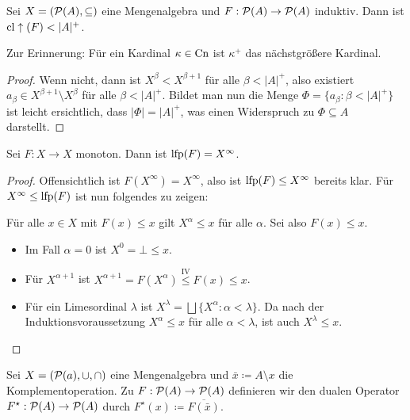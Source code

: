 \begin{lemma}
	Sei $X=(\mathcal{P}(A),\subseteq)$ eine Mengenalgebra und $F:\mathcal{P}(A)\to\mathcal{P}(A)$ induktiv. Dann ist $\operatorname{cl}\uparrow(F)< \vert A\vert ^+$.
\end{lemma}
Zur Erinnerung: Für ein Kardinal $\kappa\in \operatorname{Cn}$ ist $\kappa^+$ das nächstgrößere Kardinal.
\begin{proof}
	Wenn nicht, dann ist $X^\beta < X^{\beta+1}$ für alle $\beta<\vert A \vert^+$, also existiert $a_\beta\in X^{\beta+1}\setminus X^\beta$ für alle $\beta < \vert A \vert^+$. Bildet man nun die Menge $\Phi=\{a_\beta : \beta < \vert A\vert^+\}$ ist leicht ersichtlich, dass $\vert\Phi\vert=\vert A\vert^+$, was einen Widerspruch zu $\Phi\subseteq A$ darstellt.
\end{proof} 

\begin{satz}
	Sei $F:X\to X$ monoton. Dann ist $\operatorname{lfp}(F)=X^\infty$.
\end{satz}
\begin{proof}
	Offensichtlich ist $F(X^\infty)=X^\infty$, also ist $\operatorname{lfp}(F)\leq X^\infty$ bereits klar. Für $X^\infty \leq \operatorname{lfp}(F)$ ist nun folgendes zu zeigen:
	
	Für alle $x\in X$ mit $F(x)\leq x$ gilt $X^\alpha \leq x$ für alle $\alpha$. Sei also $F(x)\leq x$.
	\begin{itemize}
		\item Im Fall $\alpha=0$ ist $X^0=\bot\leq x$.
		\item Für $X^{\alpha+1}$ ist $X^{\alpha+1}=F(X^\alpha)\overset{\text{IV}}{\leq} F(x)\leq x$.
		\item Für ein Limesordinal $\lambda$ ist $X^\lambda=\bigsqcup\{X^\alpha : \alpha<\lambda\}$. Da nach der Induktionsvoraussetzung $X^\alpha \leq x$ für alle $\alpha<\lambda$, ist auch $X^\lambda\leq x$.
	\end{itemize}
\end{proof}
Sei $X=(\mathcal{P}(a),\cup,\cap)$ eine Mengenalgebra und $\bar{x}\coloneqq A\setminus x$ die Komplementoperation.
Zu $F:\mathcal{P}(A)\to \mathcal{P}(A)$ definieren wir den dualen Operator $F^\star:\mathcal{P}(A)\to\mathcal{P}(A)$ durch $F^\star(x)\coloneqq \overline{F(\bar{x})}$.


